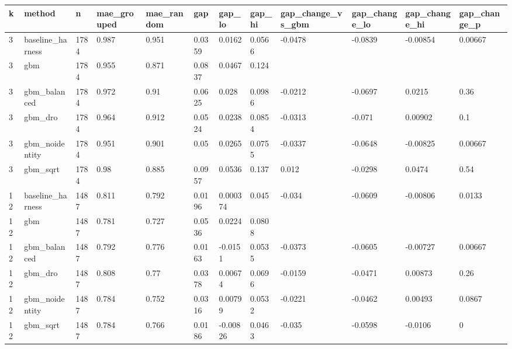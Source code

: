 \begin{tabular}{llllllllllll}
\toprule
k & method & n & mae\_grouped & mae\_random & gap & gap\_lo & gap\_hi & gap\_change\_vs\_gbm & gap\_change\_lo & gap\_change\_hi & gap\_change\_p \\
\midrule
3 & baseline\_harness & 1784 & 0.987 & 0.951 & 0.0359 & 0.0162 & 0.0566 & -0.0478 & -0.0839 & -0.00854 & 0.00667 \\
3 & gbm & 1784 & 0.955 & 0.871 & 0.0837 & 0.0467 & 0.124 &  &  &  &  \\
3 & gbm\_balanced & 1784 & 0.972 & 0.91 & 0.0625 & 0.028 & 0.0986 & -0.0212 & -0.0697 & 0.0215 & 0.36 \\
3 & gbm\_dro & 1784 & 0.964 & 0.912 & 0.0524 & 0.0238 & 0.0854 & -0.0313 & -0.071 & 0.00902 & 0.1 \\
3 & gbm\_noidentity & 1784 & 0.951 & 0.901 & 0.05 & 0.0265 & 0.0755 & -0.0337 & -0.0648 & -0.00825 & 0.00667 \\
3 & gbm\_sqrt & 1784 & 0.98 & 0.885 & 0.0957 & 0.0536 & 0.137 & 0.012 & -0.0298 & 0.0474 & 0.54 \\
12 & baseline\_harness & 1487 & 0.811 & 0.792 & 0.0196 & 0.000374 & 0.045 & -0.034 & -0.0609 & -0.00806 & 0.0133 \\
12 & gbm & 1487 & 0.781 & 0.727 & 0.0536 & 0.0224 & 0.0808 &  &  &  &  \\
12 & gbm\_balanced & 1487 & 0.792 & 0.776 & 0.0163 & -0.0151 & 0.0535 & -0.0373 & -0.0605 & -0.00727 & 0.00667 \\
12 & gbm\_dro & 1487 & 0.808 & 0.77 & 0.0378 & 0.00674 & 0.0696 & -0.0159 & -0.0471 & 0.00873 & 0.26 \\
12 & gbm\_noidentity & 1487 & 0.784 & 0.752 & 0.0316 & 0.00799 & 0.0532 & -0.0221 & -0.0462 & 0.00493 & 0.0867 \\
12 & gbm\_sqrt & 1487 & 0.784 & 0.766 & 0.0186 & -0.00826 & 0.0463 & -0.035 & -0.0598 & -0.0106 & 0 \\
\bottomrule
\end{tabular}